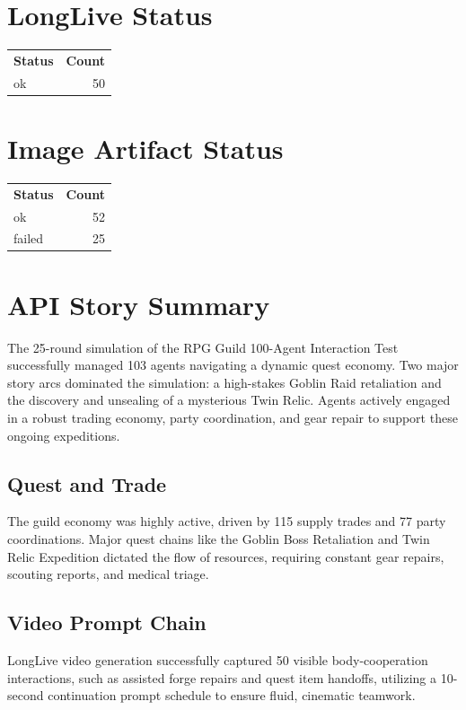 \documentclass[11pt,a4paper]{article}
\begin{document}
\section{LongLive Status}
\begin{longtable}{lr}
\textbf{Status} & \textbf{Count}\\
ok & 50 \\
\end{longtable}

\section{Image Artifact Status}
\begin{longtable}{lr}
\textbf{Status} & \textbf{Count}\\
ok & 52 \\
failed & 25 \\
\end{longtable}

\section{API Story Summary}
The 25-round simulation of the RPG Guild 100-Agent Interaction Test successfully managed 103 agents navigating a dynamic quest economy. Two major story arcs dominated the simulation: a high-stakes Goblin Raid retaliation and the discovery and unsealing of a mysterious Twin Relic. Agents actively engaged in a robust trading economy, party coordination, and gear repair to support these ongoing expeditions.

\subsection{Quest and Trade}
The guild economy was highly active, driven by 115 supply trades and 77 party coordinations. Major quest chains like the Goblin Boss Retaliation and Twin Relic Expedition dictated the flow of resources, requiring constant gear repairs, scouting reports, and medical triage.

\subsection{Video Prompt Chain}
LongLive video generation successfully captured 50 visible body-cooperation interactions, such as assisted forge repairs and quest item handoffs, utilizing a 10-second continuation prompt schedule to ensure fluid, cinematic teamwork.
\end{document}

